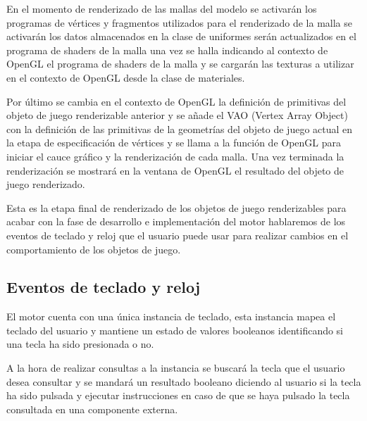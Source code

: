 \documentclass[a4paper, 17pt]{book}
\begin{document}
En el momento de renderizado de las mallas del modelo se activarán los programas de vértices y fragmentos utilizados para el
renderizado de la malla se activarán los datos almacenados en la clase de uniformes serán actualizados en el programa de shaders
de la malla una vez se halla indicando al contexto de OpenGL el programa de shaders de la malla y se cargarán las texturas a
utilizar en el contexto de OpenGL desde la clase de materiales.

\vspace{1mm} %

Por último se cambia en el contexto de OpenGL la definición de primitivas del objeto de juego renderizable anterior y se añade
el VAO (Vertex Array Object) con la definición de las primitivas de la geometrías del objeto de juego actual en la etapa de
especificación de vértices y se llama a la función de OpenGL para iniciar el cauce gráfico y la renderización de cada malla.
Una vez terminada la renderización se mostrará en la ventana de OpenGL el resultado del objeto de juego renderizado.

\vspace{1mm} %

Esta es la etapa final de renderizado de los objetos de juego renderizables para acabar con la fase de desarrollo e implementación
del motor hablaremos de los eventos de teclado y reloj que el usuario puede usar para realizar cambios en el comportamiento de
los objetos de juego.

\subsection{Eventos de teclado y reloj}
\label{subsec:eventos}

El motor cuenta con una única instancia de teclado, esta instancia mapea el teclado del usuario y mantiene un estado de valores
booleanos identificando si una tecla ha sido presionada o no. 

\vspace{1mm} %

A la hora de realizar consultas a la instancia se buscará la tecla que el usuario desea consultar y se mandará un resultado
booleano diciendo al usuario si la tecla ha sido pulsada y ejecutar instrucciones en caso de que se haya pulsado la tecla
consultada en una componente externa.

\vspace{1mm} %
\end{document}
